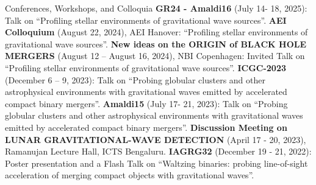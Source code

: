 \begin{rubric}{Conferences, Workshops, and Colloquia}
\entry*[] \textbf{GR24 - Amaldi16} (July 14- 18, 2025): Talk on ``Profiling stellar environments of gravitational wave sources''.
%
\entry*[] \textbf{AEI Colloquium} (August 22, 2024), AEI Hanover: ``Profiling stellar environments of gravitational wave sources''.
%
\entry*[] \textbf{New ideas on the ORIGIN of BLACK HOLE MERGERS} (August 12 – August 16, 2024), NBI Copenhagen: Invited Talk on ``Profiling stellar environments of gravitational wave sources''.
%
\entry*[] \textbf{ICGC-2023} (December 6 – 9, 2023): Talk on ``Probing globular clusters and other astrophysical environments with gravitational waves emitted by accelerated compact binary mergers''.
%
\entry*[] \textbf{Amaldi15} (July 17- 21, 2023): Talk on ``Probing globular clusters and other astrophysical environments with gravitational waves emitted by accelerated compact binary mergers''.
%
\entry*[] \textbf{Discussion Meeting on LUNAR GRAVITATIONAL-WAVE DETECTION} (April 17 - 20, 2023), Ramanujan Lecture Hall, ICTS Bengaluru.
%
\entry*[] \textbf{IAGRG32} (December 19 - 21, 2022): Poster presentation and a Flash Talk on ``Waltzing binaries: probing line-of-sight acceleration of merging compact objects with gravitational waves''.
%

\end{rubric}
